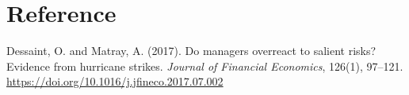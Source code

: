 \section*{Reference}

\begingroup
\raggedright
Dessaint, O. and Matray, A. (2017). Do managers overreact to salient risks? Evidence from hurricane strikes. \textit{Journal of Financial Economics}, 126(1), 97--121. \href{https://doi.org/10.1016/j.jfineco.2017.07.002}{https://doi.org/10.1016/j.jfineco.2017.07.002}
\par
\endgroup
